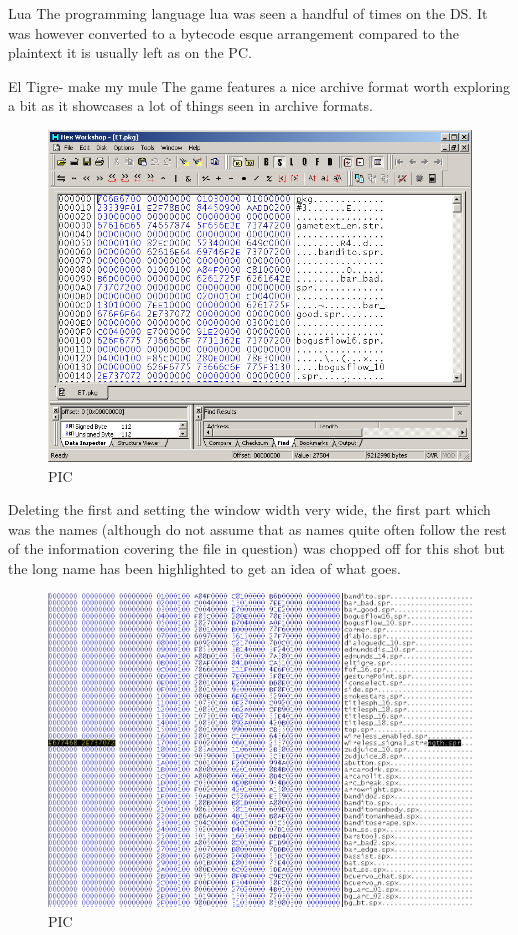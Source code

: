\documentclass[
]{book}
\begin{document}
Lua The programming language lua was seen a handful of times on the DS. It was however converted to a bytecode esque arrangement compared to the plaintext it is usually left as on the PC.

El Tigre- make my mule The game features a nice archive format worth exploring a bit as it showcases a lot of things seen in archive formats.

\begin{figure}
\centering
\includegraphics{images/127_home_fast6191_romhackingguide_unrenamed_fil___al_borders_romhackingguidearchive_eltigre_1.png}
\caption{PIC}
\end{figure}

Deleting the first and setting the window width very wide, the first part which was the names (although do not assume that as names quite often follow the rest of the information covering the file in question) was chopped off for this shot but the long name has been highlighted to get an idea of what goes.

\begin{figure}
\centering
\includegraphics{images/128_home_fast6191_romhackingguide_unrenamed_fil___al_borders_romhackingguidearchive_eltigre_2.png}
\caption{PIC}
\end{figure}
\end{document}
